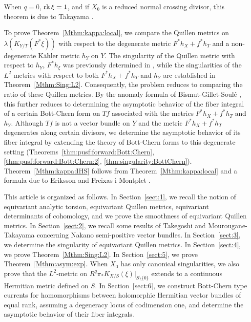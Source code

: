 \documentclass[amscd, leqno]{amsart}
\theoremstyle{plain}
\theoremstyle{definition}
\theoremstyle{remark}
\begin{document}
When $q=0$, ${\rm rk}\,\xi=1$, and if $X_{0}$ is a reduced normal crossing divisor, this theorem is due to Takayama \cite{Takayama22}.
\par
To prove Theorem~\ref{Mthm:kappa:local}, we compare the Quillen metrics on $\lambda(K_{Y/T}(F^{*}\xi))$ with respect to 
the degenerate metric $F^{*}h_{X} + f^{*}h_{T}$ and a non-degenerate K\"ahler metric $h_{Y}$ on $Y$. 
The singularity of the Quillen metric with respect to $h_{Y}$, $F^{*}h_{\xi}$ was previously determined in \cite{Yoshikawa07},
while the singularities of the $L^{2}$-metrics with respect to both $F^{*}h_{X} + f^{*}h_{T}$ and $h_{Y}$ are established in
Theorem~\ref{Mthm:Sing:L2}. Consequently, the problem reduces to comparing the ratio of these Quillen metrics. 
By the anomaly formula of Bismut-Gillet-Soul\'e \cite{BGS88}, this further reduces to determining the asymptotic behavior of 
the fiber integral of a certain Bott-Chern form on $Tf$ associated with the metrics $F^{*}h_{X} + f^{*}h_{T}$ and $h_{Y}$. 
Although $Tf$ is not a vector bundle on $Y$ and the metric $F^{*}h_{X} + f^{*}h_{T}$ degenerates along certain divisors,
we determine the asymptotic behavior of its fiber integral by extending the theory of Bott-Chern forms to this degenerate setting
(Theorems~\ref{thm:pusf:forward:Bott:Chern}, \ref{thm:pusf:forward:Bott:Chern:2}, \ref{thm:singularity:BottChern}). 
Theorem~\ref{Mthm:kappa:IHS} follows from Theorem~\ref{Mthm:kappa:local} and a formula due to
Eriksson and Freixas i Montplet \cite{ErikssonFreixas26}.
\par
This article is organized as follows.
In Section~\ref{sect:1}, we recall the notion of equivariant analytic torsion, equivariant Quillen metrics, equivariant determinants of
cohomology, and we prove the smoothness of equivariant Quillen metrics. 
In Section~\ref{sect:2}, we recall some results of Takegoshi \cite{Takegoshi95} and Mourougane-Takayama \cite{MourouganeTakayama08}
concerning Nakano semi-positive vector bundles.
In Section~\ref{sect:3}, we determine the singularity of equivariant Quillen metrics.
In Section~\ref{sect:4}, we prove Theorem~\ref{Mthm:Sing:L2}.
In Section~\ref{sect:5}, we prove Theorem~\ref{Mthm:asym:exp}. When $X_{0}$ has only canonical singularities, we also prove that
the $L^{2}$-metric on $R^{q}\pi_{*}K_{X/S}(\xi)|_{S\setminus\{0\}}$ extends to a continuous Hermitian metric defined on $S$.
In Section~\ref{sect:6}, we construct Bott-Chern type currents for homomorphisms between holomorphic Hermitian vector bundles of equal rank, 
assuming a degeneracy locus of codimension one, and determine the asymptotic behavior of their fiber integrals. 
\end{document}

